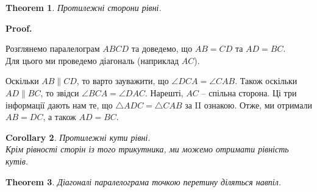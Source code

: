 \documentclass[a4paper, 10pt]{article}
\makeatletter
\def\qed{$\blacksquare$}
\theoremstyle{theoremdd}
\newtheorem{theorem}{Theorem}[subsection]
\theoremstyle{theoremdd}
\theoremstyle{theoremdd}
\theoremstyle{theoremdd}
\theoremstyle{theoremdd}
\theoremstyle{theoremdd}
\theoremstyle{theoremdd}
\theoremstyle{theoremdd}
\theoremstyle{theoremdd}
\newtheorem{corollary}[theorem]{Corollary}
\renewenvironment{proof}[1][Proof.\\]{\par
\pushQED{\hfill \qed}%
\normalfont \topsep6\p@\@plus6\p@\relax
\trivlist
\item\relax
{\bfseries
#1\@addpunct{.}}\hspace\labelsep\ignorespaces
}{%
\popQED\endtrivlist\@endpefalse
}
\makeatother
\begin{document}
\begin{theorem}
Протилежні сторони рівні.
\end{theorem}

\begin{proof}
Розглянемо паралелограм $ABCD$ та доведемо, що $AB = CD$ та $AD = BC$.\\
Для цього ми проведемо діагональ (наприклад $AC$).
\begin{figure}[H]
\centering
{}
\end{figure}
Оскільки $AB \parallel CD$, то варто зауважити, що $\angle DCA = \angle CAB$. Також оскільки $AD \parallel BC$, то звідси $\angle BCA = \angle DAC$. Нарешті, $AC$ -- спільна сторона. Ці три інформації дають нам те, що $\triangle ADC = \triangle CAB$ за II ознакою. Отже, ми отримали $AB = DC$, а також $AD = BC$.
\end{proof}

\begin{corollary}
Протилежні кути рівні.\\
\textit{Крім рівності сторін із того трикутника, ми можемо отримати рівність кутів.}
\end{corollary}

\begin{theorem}
Діагоналі паралелограма точкою перетину діляться навпіл.
\end{theorem}
\end{document}
